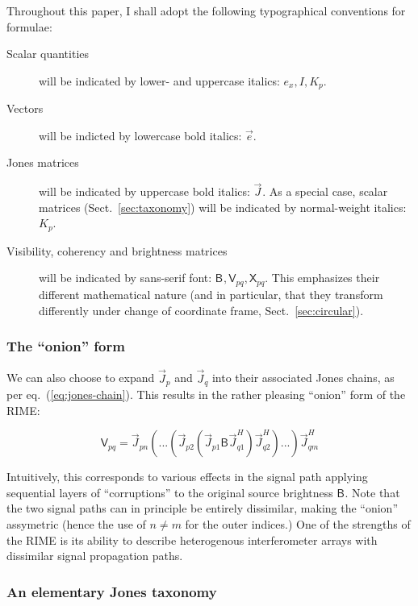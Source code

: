 \documentclass[]{aa}
\newcommand{\herm}{H}
\newcommand{\jones}[2]{\vec {#1}_{#2}}
\newcommand{\jonesT}[2]{\vec {#1}^{\herm}_{#2}}
\newcommand{\coh}[2]{\mathsf{{#1}}_{{#2}}}
\begin{document}
Throughout this paper, I shall adopt the following typographical conventions for formulae:

\begin{description}
\item[Scalar quantities] will be indicated by lower- and uppercase italics: $e_x,I,K_p$.
\item[Vectors] will be indicted by lowercase bold italics: $\vec e$.
\item[Jones matrices] will be indicated by uppercase bold italics: $\jones{J}{}$. As a special case, scalar matrices
(Sect.~\ref{sec:taxonomy}) will be indicated by normal-weight italics: $K_p$.
\item[Visibility, coherency and brightness matrices] will be indicated by sans-serif font: 
$\coh{B}{}, \coh{V}{pq}, \coh{X}{pq}$. This emphasizes their different mathematical nature (and in particular, that they transform differently under change of coordinate frame, Sect.~\ref{sec:circular}).
\end{description}


\subsubsection{The ``onion'' form}

We can also choose to expand $\jones{J}{p}$ and $\jones{J}{q}$ into their associated Jones chains, as per 
eq.~(\ref{eq:jones-chain}). This results in the rather pleasing ``onion'' form of the RIME:

    \begin{equation}\label{eq:me0-onion}
    \coh{V}{pq} = \jones{J}{pn}(...(\jones{J}{p2} (\jones{J}{p1} \coh{B}{}  \jones{J}{q1}^\herm)\jonesT{J}{q2}) ... )\jonesT{J}{qm}
    \end{equation}

Intuitively, this corresponds to various effects in the signal path applying sequential layers of ``corruptions'' to the original source brightness $\coh{B}{}$. Note that the two signal paths can in principle be entirely dissimilar, making the ``onion'' assymetric (hence the use of $n\ne m$ for the outer indices.) One of the strengths of the RIME is its ability to describe heterogenous interferometer arrays with dissimilar signal propagation paths.

\subsubsection{An elementary Jones taxonomy\label{sec:taxonomy}}
\end{document}
